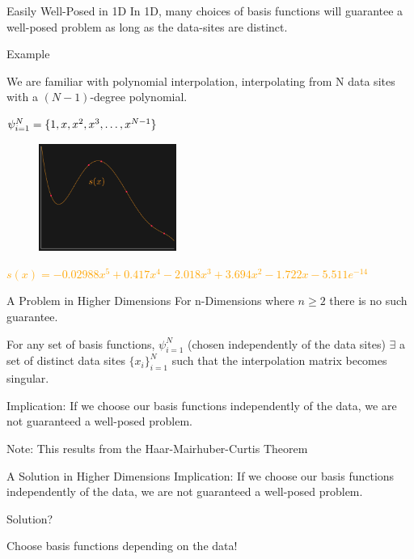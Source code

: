 \documentclass[12pt,t]{beamer}
\newcommand{\subt}[1]{{\footnotesize \color{subtitle} {#1}}}
\begin{document}
\begin{frame}{Easily Well-Posed in 1D}
In 1D, many choices of basis functions will guarantee a well-posed problem as long as the data-sites are distinct. 
\bigskip

\subt{Example}

We are familiar with \subt{polynomial interpolation}, interpolating from N data sites with a $(N-1)$-degree polynomial. 
\begin{center}
$\psi_{i=1}^N=\{1,x,x^2,x^3, \mathellipsis, x^{N-1}\}$
\end{center}
\begin{figure}
\includegraphics[width=0.4\textwidth, keepaspectratio]{fig3.png}
\end{figure}
\footnotesize{\textcolor{orange}{$s(x)=-0.02988 x^5 + 0.417 x^4 - 2.018 x^3 + 3.694 x^2 - 1.722 x - 5.511e^{-14}$}}
\note{}
\end{frame}

\begin{frame}{A Problem in Higher Dimensions}
For n-Dimensions where $n\geq 2$ there is no such guarantee.
\bigskip

For any set of basis functions, $\psi_{i=1}^N$ (chosen independently of the data sites) $\exists$ a set of distinct data sites $\{x_i\}_{i=1}^N$
such that the interpolation matrix becomes singular. 
\bigskip

\subt{Implication:}
If we choose our basis functions independently of the data, we are not guaranteed a well-posed problem.
\bigskip

\subt{Note:}
This results from the Haar-Mairhuber-Curtis Theorem


\note{}
\end{frame}

\begin{frame}[c]{A Solution in Higher Dimensions}
\subt{Implication:}
If we choose our basis functions independently of the data, we are not guaranteed a well-posed problem.
\bigskip

\subt{Solution?}

Choose basis functions depending on the data!
\bigskip

\note{}
\end{frame}
\end{document}
